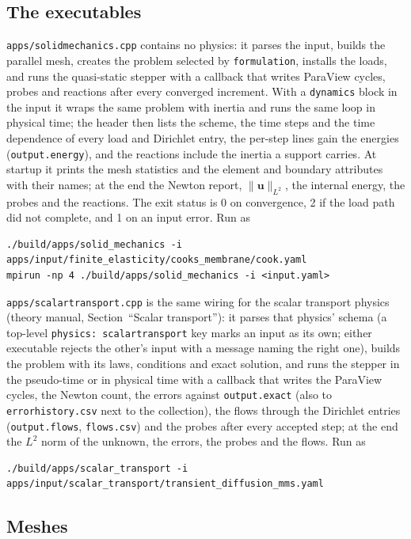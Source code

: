 \documentclass[11pt]{article}
\newcommand{\bu}{\bm{u}}
\DeclareRobustCommand{\code}[1]{{\def\_{\textunderscore\allowbreak}\texttt{#1}}}
\DeclareRobustCommand{\file}[1]{{\def\_{\textunderscore\allowbreak}\texttt{#1}}}
\begin{document}
\subsection{The executables}

\file{apps/solid\_mechanics.cpp} contains no physics: it parses the input,
builds the parallel mesh, creates the problem selected by
\code{formulation}, installs the loads, and runs the quasi-static stepper
with a callback that writes ParaView cycles, probes and reactions after
every converged increment.  With a \code{dynamics} block in the input it
wraps the same problem with inertia and runs the same loop in physical time;
the header then lists the scheme, the time steps and the time dependence of
every load and Dirichlet entry, the per-step lines gain the energies
(\code{output.energy}), and the reactions include the inertia a support
carries.  At startup it prints the mesh statistics and
the element and boundary attributes with their names; at the end the
Newton report, $\|\bu\|_{L^2}$, the internal energy, the probes and the
reactions.  The exit status is 0 on convergence, 2 if the load path did
not complete, and 1 on an input error.  Run as
\begingroup\small
\begin{verbatim}
./build/apps/solid_mechanics -i apps/input/finite_elasticity/cooks_membrane/cook.yaml
mpirun -np 4 ./build/apps/solid_mechanics -i <input.yaml>
\end{verbatim}
\endgroup
\file{apps/scalar\_transport.cpp} is the same wiring for the scalar
transport physics (theory manual, Section~``Scalar transport''): it parses
that physics' schema (a top-level \code{physics: scalar\_transport} key
marks an input as its own; either executable rejects the other's input
with a message naming the right one), builds the problem with its laws,
conditions and exact solution, and runs the stepper in the pseudo-time or
in physical time with a callback that writes the ParaView cycles, the
Newton count, the errors against \code{output.exact} (also to
\file{error\_history.csv} next to the collection), the flows through the
Dirichlet entries (\code{output.flows}, \file{flows.csv}) and the probes
after every accepted step; at the end the $L^2$ norm of the unknown, the
errors, the probes and the flows.  Run as
\begingroup\small
\begin{verbatim}
./build/apps/scalar_transport -i apps/input/scalar_transport/transient_diffusion_mms.yaml
\end{verbatim}
\endgroup

\subsection{Meshes}
\end{document}
